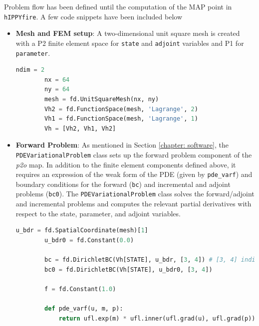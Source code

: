 Problem flow has been defined until the computation of the MAP point in \texttt{hIPPYfire}. A few code snippets have been included below

\begin{itemize}
    \item \textbf{Mesh and FEM setup}: A two-dimensional unit square mesh is created with a P2 finite element space for \texttt{state} and \texttt{adjoint} variables and P1 for \texttt{parameter}.
    \begin{lstlisting}[language=python]
        ndim = 2
        nx = 64
        ny = 64
        mesh = fd.UnitSquareMesh(nx, ny)
        Vh2 = fd.FunctionSpace(mesh, 'Lagrange', 2)
        Vh1 = fd.FunctionSpace(mesh, 'Lagrange', 1)
        Vh = [Vh2, Vh1, Vh2]
    \end{lstlisting}
    \item \textbf{Forward Problem}: As mentioned in Section \ref{chapter: software}, the \texttt{PDEVariationalProblem} class sets up the forward problem component of the \textit{p2o} map. In addition to the finite element components defined above, it requires an expression of the weak form of the PDE (given by \texttt{pde\_varf}) and boundary conditions for the forward (\texttt{bc}) and incremental and adjoint problems (\texttt{bc0}).
    The \texttt{PDEVariationalProblem} class solves the forward/adjoint and incremental problems and computes the relevant partial derivatives with respect to the state, parameter, and adjoint variables.
    \begin{lstlisting}[language=python]
        u_bdr = fd.SpatialCoordinate(mesh)[1]
        u_bdr0 = fd.Constant(0.0)

        bc = fd.DirichletBC(Vh[STATE], u_bdr, [3, 4]) # [3, 4] indicates that bc is applied to y == 0 amd y ==1
        bc0 = fd.DirichletBC(Vh[STATE], u_bdr0, [3, 4])

        f = fd.Constant(1.0)

        def pde_varf(u, m, p):
            return ufl.exp(m) * ufl.inner(ufl.grad(u), ufl.grad(p)) * ufl.dx - f * p * ufl.dx


\end{lstlisting}
\end{itemize}
